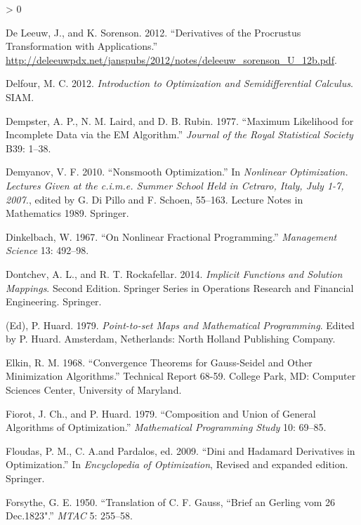 \documentclass[
  12pt,
]{book}
\newlength{\cslhangindent}
\newenvironment{CSLReferences}[2] %
 {%
  \setlength{\parindent}{0pt}
  \ifodd #1 \everypar{\setlength{\hangindent}{\cslhangindent}}\ignorespaces\fi
  \ifnum #2 > 0
  \setlength{\parskip}{#2\baselineskip}
  \fi
 }%
 {}
\begin{document}
\begin{CSLReferences}{1}{0}
\leavevmode\hypertarget{ref-deleeuw_sorenson_U_12b}{}%
De Leeuw, J., and K. Sorenson. 2012. {``{Derivatives of the Procrustus Transformation with Applications}.''} \url{http://deleeuwpdx.net/janspubs/2012/notes/deleeuw_sorenson_U_12b.pdf}.

\leavevmode\hypertarget{ref-delfour_12}{}%
Delfour, M. C. 2012. \emph{Introduction to Optimization and Semidifferential Calculus}. SIAM.

\leavevmode\hypertarget{ref-dempster_laird_rubin_77}{}%
Dempster, A. P., N. M. Laird, and D. B. Rubin. 1977. {``{Maximum Likelihood for Incomplete Data via the EM Algorithm}.''} \emph{Journal of the Royal Statistical Society} B39: 1--38.

\leavevmode\hypertarget{ref-demyanov_10}{}%
Demyanov, V. F. 2010. {``Nonsmooth Optimization.''} In \emph{Nonlinear Optimization. Lectures Given at the c.i.m.e. Summer School Held in Cetraro, Italy, July 1-7, 2007.}, edited by G. Di Pillo and F. Schoen, 55--163. Lecture Notes in Mathematics 1989. Springer.

\leavevmode\hypertarget{ref-dinkelbach_67}{}%
Dinkelbach, W. 1967. {``{On Nonlinear Fractional Programming}.''} \emph{Management Science} 13: 492--98.

\leavevmode\hypertarget{ref-dontchev_rockafellar_14}{}%
Dontchev, A. L., and R. T. Rockafellar. 2014. \emph{Implicit Functions and Solution Mappings}. Second Edition. Springer Series in Operations Research and Financial Engineering. Springer.

\leavevmode\hypertarget{ref-huard_79a}{}%
(Ed), P. Huard. 1979. \emph{{Point-to-set Maps and Mathematical Programming}}. Edited by P. Huard. Amsterdam, Netherlands: North Holland Publishing Company.

\leavevmode\hypertarget{ref-elkin_68}{}%
Elkin, R. M. 1968. {``{Convergence Theorems for {Gauss-Seidel} and Other Minimization Algorithms}.''} Technical Report 68-59. College Park, {MD}: Computer Sciences Center, University of Maryland.

\leavevmode\hypertarget{ref-fiorot_huard_79}{}%
Fiorot, J. Ch., and P. Huard. 1979. {``{Composition and Union of General Algorithms of Optimization}.''} \emph{Mathematical Programming Study} 10: 69--85.

\leavevmode\hypertarget{ref-demyanov_09}{}%
Floudas, P. M., C. A.and Pardalos, ed. 2009. {``Dini and Hadamard Derivatives in Optimization.''} In \emph{Encyclopedia of Optimization}, Revised and expanded edition. Springer.

\leavevmode\hypertarget{ref-forsythe_50}{}%
Forsythe, G. E. 1950. {``{Translation of C. F. Gauss, ``Brief an Gerling vom 26 Dec.1823"}.''} \emph{MTAC} 5: 255--58.


\end{CSLReferences}
\end{document}
